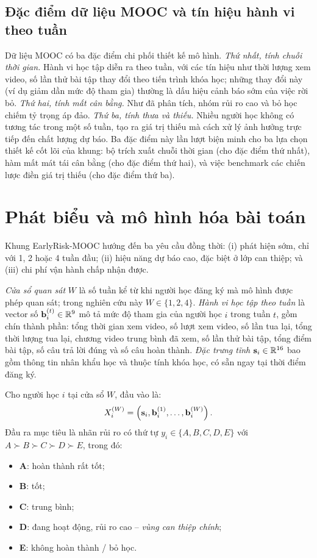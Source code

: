 \subsection{Đặc điểm dữ liệu MOOC và tín hiệu hành vi theo tuần}

Dữ liệu MOOC có ba đặc điểm chi phối thiết kế mô hình. \textit{Thứ nhất, tính chuỗi thời gian.} Hành vi học tập diễn ra theo tuần, với các tín hiệu như thời lượng xem video, số lần thử bài tập thay đổi theo tiến trình khóa học; những thay đổi này (ví dụ giảm dần mức độ tham gia) thường là dấu hiệu cảnh báo sớm của việc rời bỏ. \textit{Thứ hai, tính mất cân bằng.} Như đã phân tích, nhóm rủi ro cao và bỏ học chiếm tỷ trọng áp đảo. \textit{Thứ ba, tính thưa và thiếu.} Nhiều người học không có tương tác trong một số tuần, tạo ra giá trị thiếu mà cách xử lý ảnh hưởng trực tiếp đến chất lượng dự báo. Ba đặc điểm này lần lượt biện minh cho ba lựa chọn thiết kế cốt lõi của khung: bộ trích xuất chuỗi thời gian (cho đặc điểm thứ nhất), hàm mất mát tái cân bằng (cho đặc điểm thứ hai), và việc benchmark các chiến lược điền giá trị thiếu (cho đặc điểm thứ ba).

\section{Phát biểu và mô hình hóa bài toán}
\label{sec:phatbieu}

Khung EarlyRisk-MOOC hướng đến ba yêu cầu đồng thời: (i) phát hiện sớm, chỉ với 1, 2 hoặc 4 tuần đầu; (ii) hiệu năng dự báo cao, đặc biệt ở lớp can thiệp; và (iii) chi phí vận hành chấp nhận được.

\textit{Cửa sổ quan sát} $W$ là số tuần kể từ khi người học đăng ký mà mô hình được phép quan sát; trong nghiên cứu này $W \in \{1, 2, 4\}$. \textit{Hành vi học tập theo tuần} là vector số $\mathbf{b}_i^{(t)} \in \mathbb{R}^9$ mô tả mức độ tham gia của người học $i$ trong tuần $t$, gồm chín thành phần: tổng thời gian xem video, số lượt xem video, số lần tua lại, tổng thời lượng tua lại, chương video trung bình đã xem, số lần thử bài tập, tổng điểm bài tập, số câu trả lời đúng và số câu hoàn thành. \textit{Đặc trưng tĩnh} $\mathbf{s}_i \in \mathbb{R}^{16}$ bao gồm thông tin nhân khẩu học và thuộc tính khóa học, có sẵn ngay tại thời điểm đăng ký.

Cho người học $i$ tại cửa sổ $W$, đầu vào là:
\begin{equation}
X_i^{(W)} = \left(\mathbf{s}_i, \mathbf{b}_i^{(1)}, \dots, \mathbf{b}_i^{(W)}\right).
\end{equation}
Đầu ra mục tiêu là nhãn rủi ro có thứ tự $y_i \in \{A, B, C, D, E\}$ với $A \succ B \succ C \succ D \succ E$, trong đó:
\begin{itemize}[leftmargin=1.2cm,topsep=2pt,itemsep=0pt]
  \item \textbf{A}: hoàn thành rất tốt;
  \item \textbf{B}: tốt;
  \item \textbf{C}: trung bình;
  \item \textbf{D}: đang hoạt động, rủi ro cao -- \emph{vùng can thiệp chính};
  \item \textbf{E}: không hoàn thành / bỏ học.
\end{itemize}


